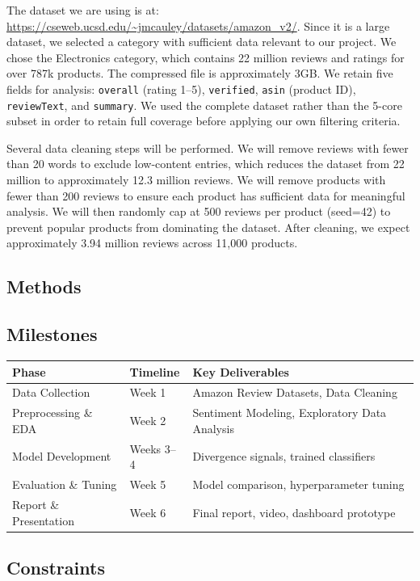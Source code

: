 \documentclass[12pt]{article}
\begin{document}
The dataset we are using is at: \url{https://cseweb.ucsd.edu/~jmcauley/datasets/amazon_v2/}. Since it is a large dataset, we selected a category with sufficient data relevant to our project. We chose the Electronics category, which contains 22 million reviews and ratings for over 787k products. The compressed file is approximately 3GB. We retain five fields for analysis: \texttt{overall} (rating 1--5), \texttt{verified}, \texttt{asin} (product ID), \texttt{reviewText}, and \texttt{summary}. We used the complete dataset rather than the 5-core subset in order to retain full coverage before applying our own filtering criteria.

Several data cleaning steps will be performed. We will remove reviews with fewer than 20 words to exclude low-content entries, which reduces the dataset from 22 million to approximately 12.3 million reviews. We will remove products with fewer than 200 reviews to ensure each product has sufficient data for meaningful analysis. We will then randomly cap at 500 reviews per product (seed=42) to prevent popular products from dominating the dataset. After cleaning, we expect approximately 3.94 million reviews across 11,000 products.

\subsection*{Methods}

\subsection*{Milestones}

\begin{table}[H]
\centering
\small
\begin{tabular}{lll}
\toprule
\textbf{Phase} & \textbf{Timeline} & \textbf{Key Deliverables} \\
\midrule
Data Collection & Week 1 & Amazon Review Datasets, Data Cleaning \\
Preprocessing \& EDA & Week 2 & Sentiment Modeling, Exploratory Data Analysis \\
Model Development & Weeks 3--4 & Divergence signals, trained classifiers \\
Evaluation \& Tuning & Week 5 & Model comparison, hyperparameter tuning \\
Report \& Presentation & Week 6 & Final report, video, dashboard prototype \\
\bottomrule
\end{tabular}
\end{table}

\subsection*{Constraints}
\end{document}
